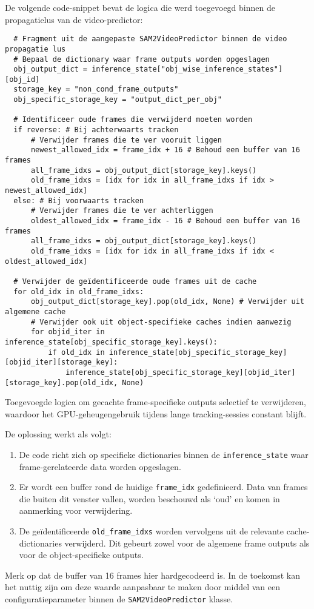 De volgende code-snippet bevat de logica die werd toegevoegd binnen de propagatielus van de video-predictor:
\begin{listing}[H]
  \begin{verbatim}
  # Fragment uit de aangepaste SAM2VideoPredictor binnen de video propagatie lus
  # Bepaal de dictionary waar frame outputs worden opgeslagen
  obj_output_dict = inference_state["obj_wise_inference_states"][obj_id]
  storage_key = "non_cond_frame_outputs"
  obj_specific_storage_key = "output_dict_per_obj"

  # Identificeer oude frames die verwijderd moeten worden
  if reverse: # Bij achterwaarts tracken
      # Verwijder frames die te ver vooruit liggen
      newest_allowed_idx = frame_idx + 16 # Behoud een buffer van 16 frames
      all_frame_idxs = obj_output_dict[storage_key].keys()
      old_frame_idxs = [idx for idx in all_frame_idxs if idx > newest_allowed_idx]
  else: # Bij voorwaarts tracken
      # Verwijder frames die te ver achterliggen
      oldest_allowed_idx = frame_idx - 16 # Behoud een buffer van 16 frames
      all_frame_idxs = obj_output_dict[storage_key].keys()
      old_frame_idxs = [idx for idx in all_frame_idxs if idx < oldest_allowed_idx]

  # Verwijder de geïdentificeerde oude frames uit de cache
  for old_idx in old_frame_idxs:
      obj_output_dict[storage_key].pop(old_idx, None) # Verwijder uit algemene cache
      # Verwijder ook uit object-specifieke caches indien aanwezig
      for objid_iter in inference_state[obj_specific_storage_key].keys():
          if old_idx in inference_state[obj_specific_storage_key][objid_iter][storage_key]:
              inference_state[obj_specific_storage_key][objid_iter][storage_key].pop(old_idx, None)
  \end{verbatim}
  \caption[Geheugenoptimalisatie in SAM2 door caching van frame outputs]{Toegevoegde logica om gecachte frame-specifieke outputs selectief te verwijderen, waardoor het GPU-geheugengebruik tijdens lange tracking-sessies constant blijft.}
  \label{lst:sam2-memory-fix}
\end{listing}

De oplossing werkt als volgt:
\begin{enumerate}
  \item De code richt zich op specifieke dictionaries binnen de \texttt{inference\_state} waar frame-gerelateerde data worden opgeslagen.
  \item Er wordt een buffer rond de huidige \texttt{frame\_idx} gedefinieerd. Data van frames die buiten dit venster vallen, worden beschouwd als `oud' en komen in aanmerking voor verwijdering.
  \item De geïdentificeerde \texttt{old\_frame\_idxs} worden vervolgens uit de relevante cache-dictionaries verwijderd. Dit gebeurt zowel voor de algemene frame outputs als voor de object-specifieke outputs.
\end{enumerate}
Merk op dat de buffer van 16 frames hier hardgecodeerd is. 
In de toekomst kan het nuttig zijn om deze waarde aanpasbaar te maken door middel van een configuratieparameter binnen de \texttt{SAM2VideoPredictor} klasse.

